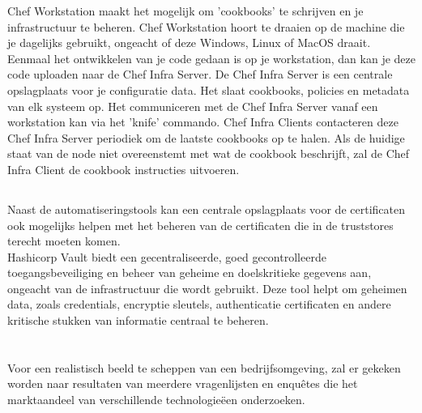 Chef Workstation maakt het mogelijk om 'cookbooks' te schrijven en je infrastructuur te beheren. Chef Workstation hoort te draaien op de machine die je dagelijks gebruikt, ongeacht of deze Windows, Linux of MacOS draait.
Eenmaal het ontwikkelen van je code gedaan is op je workstation, dan kan je deze code uploaden naar de Chef Infra Server. De Chef Infra Server is een centrale opslagplaats voor je configuratie data. Het slaat cookbooks, policies en metadata van elk systeem op. Het communiceren met de Chef Infra Server vanaf een workstation kan via het 'knife' commando.
Chef Infra Clients contacteren deze Chef Infra Server periodiek om de laatste cookbooks op te halen. Als de huidige staat van de node niet overeenstemt met wat de cookbook beschrijft, zal de Chef Infra Client de cookbook instructies uitvoeren. \autocite{Chef} \\

\subsection{}
\label{subsec:Hashicorp_Vault}
Naast de automatiseringstools kan een centrale opslagplaats voor de certificaten ook mogelijks helpen met het beheren van de certificaten die in de truststores terecht moeten komen. \\

Hashicorp Vault biedt een gecentraliseerde, goed gecontrolleerde toegangsbeveiliging en beheer van geheime en doelskritieke gegevens aan, ongeacht van de infrastructuur die wordt gebruikt.
Deze tool helpt om geheimen data, zoals credentials, encryptie sleutels, authenticatie certificaten en andere kritische stukken van informatie centraal te beheren. \autocite{Hashicorp}




\pagebreak

\section{}%
\label{sec:Infrastructuur studie}

Voor een realistisch beeld te scheppen van een bedrijfsomgeving, zal er gekeken worden naar resultaten van meerdere vragenlijsten en enquêtes die het marktaandeel van verschillende technologieëen onderzoeken. \\

\subsection{}
\label{subsec:Webservers}

